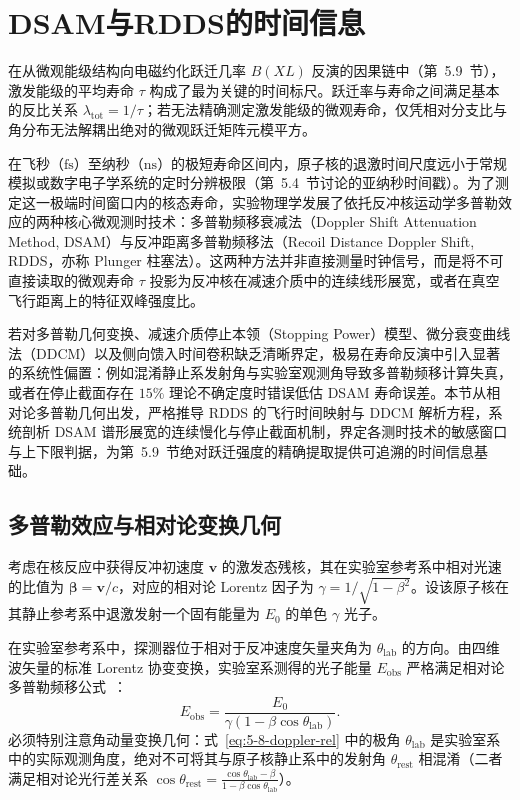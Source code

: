 \section{DSAM与RDDS的时间信息}\label{sec:5-8}

在从微观能级结构向电磁约化跃迁几率 $B(XL)$ 反演的因果链中（第~5.9~节），激发能级的平均寿命 $\tau$ 构成了最为关键的时间标尺。跃迁率与寿命之间满足基本的反比关系 $\lambda_{\mathrm{tot}} = 1/\tau$；若无法精确测定激发能级的微观寿命，仅凭相对分支比与角分布无法解耦出绝对的微观跃迁矩阵元模平方。

在飞秒（$\text{fs}$）至纳秒（$\text{ns}$）的极短寿命区间内，原子核的退激时间尺度远小于常规模拟或数字电子学系统的定时分辨极限（第~5.4~节讨论的亚纳秒时间戳）。为了测定这一极端时间窗口内的核态寿命，实验物理学发展了依托反冲核运动学多普勒效应的两种核心微观测时技术：多普勒频移衰减法（Doppler Shift Attenuation Method, DSAM）与反冲距离多普勒频移法（Recoil Distance Doppler Shift, RDDS，亦称 Plunger 柱塞法）。这两种方法并非直接测量时钟信号，而是将不可直接读取的微观寿命 $\tau$ 投影为反冲核在减速介质中的连续线形展宽，或者在真空飞行距离上的特征双峰强度比。

若对多普勒几何变换、减速介质停止本领（Stopping Power）模型、微分衰变曲线法（DDCM）以及侧向馈入时间卷积缺乏清晰界定，极易在寿命反演中引入显著的系统性偏置：例如混淆静止系发射角与实验室观测角导致多普勒频移计算失真，或者在停止截面存在 $15\%$ 理论不确定度时错误低估 DSAM 寿命误差。本节从相对论多普勒几何出发，严格推导 RDDS 的飞行时间映射与 DDCM 解析方程，系统剖析 DSAM 谱形展宽的连续慢化与停止截面机制，界定各测时技术的敏感窗口与上下限判据，为第~5.9~节绝对跃迁强度的精确提取提供可追溯的时间信息基础。

\subsection{多普勒效应与相对论变换几何}\label{subsec:5-8-1}

考虑在核反应中获得反冲初速度 $\mathbf{v}$ 的激发态残核，其在实验室参考系中相对光速的比值为 $\boldsymbol{\beta} = \mathbf{v}/c$，对应的相对论 Lorentz 因子为 $\gamma = 1/\sqrt{1 - \beta^2}$。设该原子核在其静止参考系中退激发射一个固有能量为 $E_0$ 的单色 $\gamma$ 光子。

在实验室参考系中，探测器位于相对于反冲速度矢量夹角为 $\theta_{\mathrm{lab}}$ 的方向。由四维波矢量的标准 Lorentz 协变变换，实验室系测得的光子能量 $E_{\mathrm{obs}}$ 严格满足相对论多普勒频移公式~\cite{dewald-2012-ddcm-recoil-distance}：
\begin{equation}\label{eq:5-8-doppler-rel}
E_{\mathrm{obs}} = \frac{E_0}{\gamma (1 - \beta \cos\theta_{\mathrm{lab}})}.
\end{equation}
必须特别注意角动量变换几何：式~\eqref{eq:5-8-doppler-rel} 中的极角 $\theta_{\mathrm{lab}}$ 是实验室系中的实际观测角度，绝对不可将其与原子核静止系中的发射角 $\theta_{\mathrm{rest}}$ 相混淆（二者满足相对论光行差关系 $\cos\theta_{\mathrm{rest}} = \frac{\cos\theta_{\mathrm{lab}} - \beta}{1 - \beta\cos\theta_{\mathrm{lab}}}$）。

